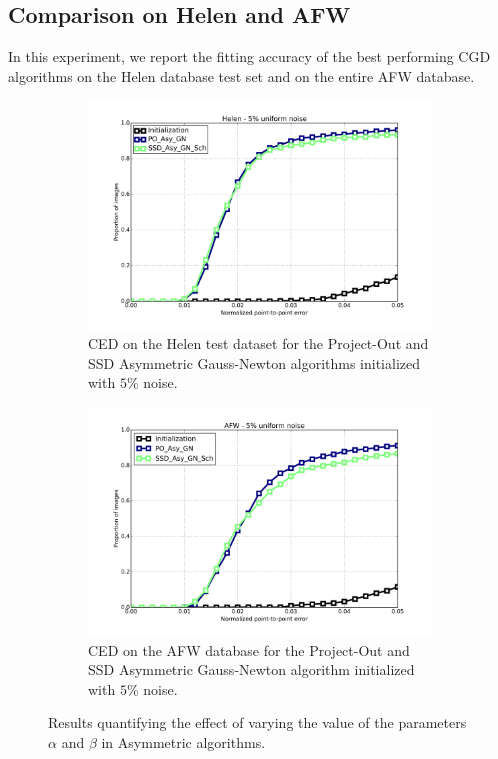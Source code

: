 \subsection{Comparison on Helen and AFW}

In this experiment, we report the fitting accuracy of the best performing CGD algorithms on the Helen database test set and on the entire AFW \cite{Zhu2012} database.

\begin{figure}[h!]
	\centering
	\begin{subfigure}{0.48\textwidth}
	    \includegraphics[width=\textwidth]{experiments/best/ced_helen_5.png}
	    \caption{CED on the Helen test dataset for the Project-Out and SSD Asymmetric Gauss-Newton algorithms initialized with $5\%$ noise.}
	    \label{fig:ced_po_for_gn}
	\end{subfigure}
	\hfill
	\begin{subfigure}{0.48\textwidth}
	    \includegraphics[width=\textwidth]{experiments/best/ced_afw_5.png}
	    \caption{CED on the AFW database for the Project-Out and SSD Asymmetric Gauss-Newton algorithm initialized with $5\%$ noise.}
	    \label{fig:ced_po_inv_gn}
	\end{subfigure}
	\label{fig:alpha}
	\caption{Results quantifying the effect of varying the value of the parameters $\alpha$ and $\beta$ in Asymmetric algorithms.}
\end{figure}

